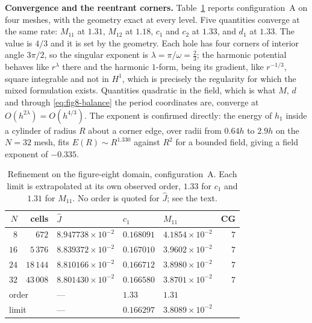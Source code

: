 \documentclass{article}
\begin{document}
\medskip
\noindent\textbf{Convergence and the reentrant corners.}
Table~\ref{tab:fig8-refine} reports configuration~A on four meshes, with the
geometry exact at every level. Five quantities converge at the same rate:
$M_{11}$ at $1.31$, $M_{12}$ at $1.18$, $c_{1}$ and $c_{2}$ at $1.33$, and
$d_{1}$ at $1.33$. The value is $4/3$ and it is set by the geometry. Each hole
has four corners of interior angle $3\pi/2$, so the singular exponent is
$\lambda=\pi/\omega=\tfrac23$; the harmonic potential behaves like
$r^{\lambda}$ there and the harmonic $1$-form, being its gradient, like
$r^{-1/3}$, square integrable and not in $H^{1}$, which is precisely the
regularity for which the mixed formulation exists. Quantities quadratic in the
field, which is what $M$, $d$ and through \eqref{eq:fig8-balance} the period
coordinates are, converge at $O(h^{2\lambda})=O(h^{4/3})$. The exponent is
confirmed directly: the energy of $h_{1}$ inside a cylinder of radius $R$
about a corner edge, over radii from $0.64h$ to $2.9h$ on the $N=32$ mesh,
fits $E(R)\sim R^{1.330}$ against $R^{2}$ for a bounded field, giving a field
exponent of $-0.335$.

\begin{table}[htbp]
\centering
\begin{tabular}{rrlllr}
\toprule
$N$ & cells & $\widehat J$ & $c_{1}$ & $M_{11}$ & CG\\
\midrule
 $8$ &    $672$ & $8.947738\times10^{-2}$ & $0.168091$
     & $4.1854\times10^{-2}$ & $7$\\
$16$ & $5\,376$ & $8.839372\times10^{-2}$ & $0.167010$
     & $3.9602\times10^{-2}$ & $7$\\
$24$ & $18\,144$ & $8.810166\times10^{-2}$ & $0.166712$
     & $3.8980\times10^{-2}$ & $7$\\
$32$ & $43\,008$ & $8.801430\times10^{-2}$ & $0.166580$
     & $3.8701\times10^{-2}$ & $7$\\
\midrule
\multicolumn{2}{l}{order} & --- & $1.33$ & $1.31$ & \\
\multicolumn{2}{l}{limit} & --- & $0.166297$ & $3.8089\times10^{-2}$ & \\
\bottomrule
\end{tabular}
\caption{Refinement on the figure-eight domain, configuration~A. Each limit is
extrapolated at its own observed order, $1.33$ for $c_{1}$ and $1.31$ for
$M_{11}$. No order is quoted for $\widehat J$; see the text.}
\label{tab:fig8-refine}
\end{table}
\end{document}
